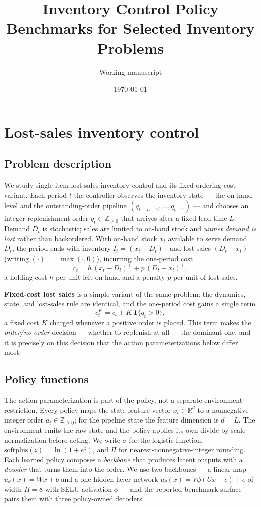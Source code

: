 \documentclass[11pt]{article}
\title{Inventory Control Policy Benchmarks for Selected Inventory Problems}
\author{Working manuscript}
\date{\today}
\begin{document}
\maketitle

\section{Lost-sales inventory control}

\subsection{Problem description}

We study single-item lost-sales inventory control and its fixed-ordering-cost variant. Each period
$t$ the controller observes the inventory state --- the on-hand level and the outstanding-order
pipeline $(q_{t-L+1},\dots,q_{t-1})$ --- and chooses an integer replenishment order
$q_t\in\mathbb{Z}_{\ge 0}$ that arrives after a fixed lead time $L$. Demand $D_t$ is stochastic;
sales are limited to on-hand stock and \emph{unmet demand is lost} rather than backordered. With
on-hand stock $x_t$ available to serve demand $D_t$, the period ends with inventory
$I_t=(x_t-D_t)^{+}$ and lost sales $(D_t-x_t)^{+}$ (writing $(\cdot)^{+}=\max(\cdot,0)$), incurring
the one-period cost
\[
c_t = h\,(x_t-D_t)^{+} + p\,(D_t-x_t)^{+},
\]
a holding cost $h$ per unit left on hand and a penalty $p$ per unit of lost sales.

\textbf{Fixed-cost lost sales} is a simple variant of the same problem: the dynamics, state, and
lost-sales rule are identical, and the one-period cost gains a single term
\[
c_t^{K} = c_t + K\,\mathbf{1}\{q_t>0\},
\]
a fixed cost $K$ charged whenever a positive order is placed. This term makes the
\emph{order/no-order} decision --- whether to replenish at all --- the dominant one, and it is
precisely on this decision that the action parameterizations below differ most.

\subsection{Policy functions}

The action parameterization is part of the policy, not a separate environment restriction. Every
policy maps the state feature vector $x_t\in\mathbb{R}^d$ to a nonnegative integer order
$a_t\in\mathbb{Z}_{\ge 0}$; for the pipeline state the feature dimension is $d=L$. The environment
emits the raw state and the policy applies its own divide-by-scale normalization before acting. We
write $\sigma$ for the logistic function, $\mathrm{softplus}(z)=\ln(1+e^{z})$, and $\Pi$ for
nearest-nonnegative-integer rounding. Each learned policy composes a \emph{backbone} that produces latent
outputs with a \emph{decoder} that turns them into the order. We use two backbones --- a linear map
$u_\theta(x)=Wx+b$ and a one-hidden-layer network $u_\theta(x)=V\phi(Ux+c)+e$ of width $H=8$ with
SELU activation $\phi$ --- and the reported benchmark surface pairs them with three policy-owned
decoders.
\end{document}
